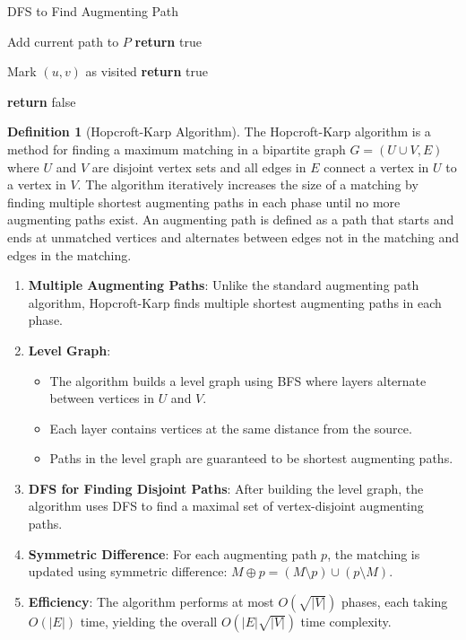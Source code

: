 \documentclass{article}
\theoremstyle{definition}
\newtheorem{definition}{Definition}
\begin{document}
\begin{algorithm}
\caption{DFS to Find Augmenting Path}
\begin{algorithmic}[1]
   
    \State Add current path to $P$
    \State \textbf{return} true
  \EndIf
  
    \State Mark $(u,v)$ as visited
      \State \textbf{return} true
    \EndIf
  \EndFor
  
  \State \textbf{return} false
\EndProcedure
\end{algorithmic}
\end{algorithm}

\pagebreak
\newpage
\clearpage

\begin{definition}[Hopcroft-Karp Algorithm]
The Hopcroft-Karp algorithm is a method for finding a maximum matching in a bipartite graph $G = (U \cup V, E)$ where $U$ and $V$ are disjoint vertex sets and all edges in $E$ connect a vertex in $U$ to a vertex in $V$. The algorithm iteratively increases the size of a matching by finding multiple shortest augmenting paths in each phase until no more augmenting paths exist. An augmenting path is defined as a path that starts and ends at unmatched vertices and alternates between edges not in the matching and edges in the matching.

\end{definition}

\begin{enumerate}
\item \textbf{Multiple Augmenting Paths}: Unlike the standard augmenting path algorithm, Hopcroft-Karp finds multiple shortest augmenting paths in each phase.

\item \textbf{Level Graph}: 
   \begin{itemize}
   \item The algorithm builds a level graph using BFS where layers alternate between vertices in $U$ and $V$.
   \item Each layer contains vertices at the same distance from the source.
   \item Paths in the level graph are guaranteed to be shortest augmenting paths.
   \end{itemize}

\item \textbf{DFS for Finding Disjoint Paths}: After building the level graph, the algorithm uses DFS to find a maximal set of vertex-disjoint augmenting paths.

\item \textbf{Symmetric Difference}: For each augmenting path $p$, the matching is updated using symmetric difference: $M \oplus p = (M \setminus p) \cup (p \setminus M)$.

\item \textbf{Efficiency}: The algorithm performs at most $O(\sqrt{|V|})$ phases, each taking $O(|E|)$ time, yielding the overall $O(|E|\sqrt{|V|})$ time complexity.
\end{enumerate}
\end{document}

